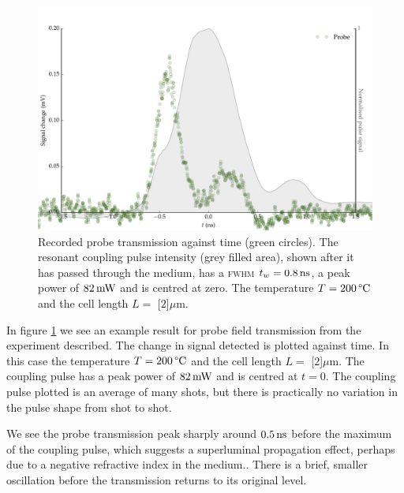     \begin{figure}[h]
      \includegraphics[width=\linewidth]
        {figs/06_simultons/1704_temp_scaled_data_colormap_201C_fig1.pdf}
      \caption{
      Recorded probe transmission against time (green circles). The  resonant
      coupling pulse intensity (grey filled area), shown after it has passed
      through the medium, has a \textsc{fwhm} $t_w = \unit[0.8]{ns}$, a peak
      power of $\unit[82]{mW}$ and is centred at zero. The temperature $T =
      \unit[200]{\textrm{\textdegree C}}$  and the cell length $L = $
      \unit[$2$]{$\mu$m}.
      }
      \label{fig:data_1704_temp_201C}
    \end{figure}

    In figure \ref{fig:data_1704_temp_201C} we see an example result for probe
    field transmission from the experiment described. The change in signal
    detected is plotted against time. In this case the temperature $T =
    \unit[200]{\textrm{\textdegree C}}$ and the cell length $L = $
    \unit[$2$]{$\mu$m}. The coupling pulse has a peak power of $\unit[82]{mW}$
    and is centred at $t\!=\!0$. The coupling pulse plotted is an average of
    many shots, but there is practically no variation in the pulse shape from
    shot to shot.

    We see the probe transmission peak sharply around $\unit[0.5]{ns}$ before
    the maximum of the coupling pulse, which suggests a superluminal propagation
    effect, perhaps due to a negative refractive index in the
    medium.\cite{Keaveney2012}. There is a brief, smaller oscillation before the
    transmission returns to its original level.


